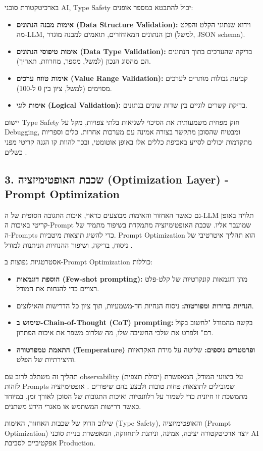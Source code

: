בארכיטקטורת סוכני AI, Type Safety יכול להתבטא במספר אופנים:

\begin{itemize}
  \item \textbf{אימות מבנה הנתונים (Data Structure Validation):} וידוא שנתוני הקלט והפלט מה-LLM, וכן הנתונים המאוחזרים, תואמים למבנה מוגדר (למשל, JSON schema).
  \item \textbf{אימות טיפוסי הנתונים (Data Type Validation):} בדיקה שהערכים בתוך הנתונים הם מהסוג הנכון (למשל, מספר, מחרוזת, תאריך).
  \item \textbf{אימות טווח ערכים (Value Range Validation):} קביעת גבולות מותרים לערכים מסוימים (למשל, ציון בין 0 ל-100).
  \item \textbf{אימות לוגי (Logical Validation):} בדיקת קשרים לוגיים בין שדות שונים בנתונים.
\end{itemize}

יישום Type Safety חזק מפחית משמעותית את הסיכוי לשגיאות בלתי צפויות, מקל על Debugging, ומבטיח שהסוכן מתקשר בצורה אמינה עם מערכות אחרות. כלים וספריות מתקדמות יכולים לסייע באכיפת כללים אלו באופן אוטומטי, ובכך להוות קו הגנה קריטי מפני כשלים \cite{Reger2026}.

\subsection{3. שכבת האופטימיזציה (Optimization Layer) - Prompt Optimization}

גם כאשר האחזור והאימות מבוצעים כראוי, איכות התגובה הסופית של ה-LLM תלויה באופן קריטי באיכות ה-Prompt שמועבר אליו. שכבת האופטימיזציה מתמקדת בשיפור מתמיד של ה-Prompts כדי להשיג תוצאות מיטביות. Prompt Optimization הוא תהליך איטרטיבי של ניסוח, בדיקה, ושיפור ההנחיות הניתנות למודל \cite{Reger2026}.

אסטרטגיות נפוצות ב-Prompt Optimization כוללות:

\begin{itemize}
  \item \textbf{הוספת דוגמאות (Few-shot prompting):} מתן דוגמאות קונקרטיות של קלט-פלט רצויים כדי להנחות את המודל.
  \item \textbf{הנחיות ברורות ומפורטות:} ניסוח הנחיות חד-משמעיות, תוך ציון כל הדרישות והאילוצים.
  \item \textbf{שימוש ב-Chain-of-Thought (CoT) prompting:} בקשה מהמודל "לחשוב בקול רם" ולפרט את שלבי החשיבה שלו, מה שלרוב משפר את איכות הפתרון.
  \item \textbf{התאמת טמפרטורה (Temperature) ופרמטרים נוספים:} שליטה על מידת האקראיות והיצירתיות של הפלט.
\end{itemize}

תהליך זה משתלב לרוב עם observability (יכולת תצפית) על ביצועי המודל, המאפשרת לזהות Prompts שמובילים לתוצאות פחות טובות ולבצע בהם שיפורים \cite{Reger2026}. אופטימיזציה מתמשכת זו חיונית כדי לשמור על רלוונטיות ואיכות התגובות של הסוכן לאורך זמן, במיוחד כאשר דרישות המשתמש או מאגרי הידע משתנים.

שילוב הדוק של שכבות האחזור, האימות (Type Safety), והאופטימיזציה (Prompt Optimization) יוצר ארכיטקטורה יציבה, אמינה, וניתנת לתחזוקה, המאפשרת בניית סוכני AI אפקטיביים לסביבת Production.
